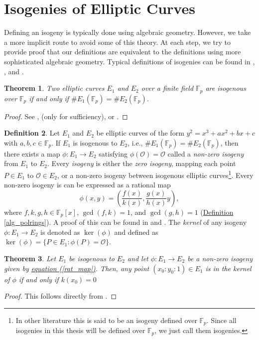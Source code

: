 \documentclass[openany, a4paper, 10pt]{book}
\theoremstyle{plain}
\newtheorem{theorem}{Theorem}[chapter]
\theoremstyle{plain}
\theoremstyle{plain}
\theoremstyle{definition}
\newtheorem{definition}[theorem]{Definition}
\theoremstyle{plain}
\theoremstyle{definition}
\theoremstyle{remark}
\renewcommand{\eqref}[1]{\hyperref[#1]{equation (\ref{#1})}}
\newcommand{\defref}[1]{\hyperref[#1]{Definition \ref{#1}}}
\begin{document}
\section{Isogenies of Elliptic Curves}\label{sec:isogenies}
Defining an isogeny is typically done using algebraic geometry.
However, we take a more implicit route to avoid some of this theory.
At each step, we try to provide proof that our definitions are equivalent to the definitions using more sophisticated algebraic geometry.
Typical definitions of isogenies can be found in
\cite[Chapter~5,Section~9.6]{galbraith_crypto},
\cite{rational_maps}, and
\cite[Chapters~I,II,Section~III.4]{arithmetic}.


\begin{theorem}\label{Sato-Tate}
    Two elliptic curves $E_1$ and $E_2$ over a finite field $\mathbb F_p$ are \emph{isogenous} over $\mathbb F_p$ if and only if $\#E_1(\mathbb F_p) = \#E_2(\mathbb F_p)$.
\end{theorem}
\begin{proof}
    See \cite{tate_isogeny_theorem}, \cite[Theorem~9.7.4]{galbraith_crypto} (only for sufficiency), or \cite[Exercise~5.4]{arithmetic}.
\end{proof}
\begin{definition}\label{is_isogeny}
    Let $E_1$ and $E_2$ be elliptic curves of the form $y^2 = x^3 + ax^2 + bx + c$ with $a,b,c \in \mathbb F_p$.
    If $E_1$ is isogenous to $E_2$, i.e., $\#E_1(\mathbb F_p) = \#E_2(\mathbb F_p)$, then there exists a map $\phi: E_1 \to E_2$ satisfying $\phi(\mathcal O) = \mathcal O$ called a \textit{non-zero isogeny} from $E_1$ to $E_2$.
    Every \textit{isogeny} is either the \textit{zero isogeny}, mapping each point $P \in E_1$ to $\mathcal O \in E_2$, or a non-zero isogeny between isogenous elliptic curves\footnote[2]{In other literature this is said to be an isogeny defined over $\mathbb F_p$. Since all isogenies in this thesis will be defined over $\mathbb F_p$, we just call them isogenies.}.
    Every non-zero isogeny is can be expressed as a rational map
    \begin{equation}\label{rat_map}
        \phi(x, y) = \left( \frac{f(x)}{k(x)}, \frac{g(x)}{h(x)}y \right),
    \end{equation}
    where $f,k,g,h \in \mathbb F_p[x]$, $\gcd(f, k) = 1$, and $\gcd(g, h) = 1$ (\defref{alg_polrings}).
    A proof of this can be found in \cite[Lemma~4.26]{rational_maps} and \cite[Lemma~9.6.12]{galbraith_crypto}.
    The \textit{kernel} of any isogeny $\phi: E_1 \to E_2$ is denoted as $\ker(\phi)$ and defined as $\ker(\phi) = \{ P \in E_1: \phi(P) = \mathcal O \}$.
\end{definition}
\begin{theorem}\label{ker_pol}
    Let $E_1$ be isogenous to $E_2$ and let $\phi: E_1 \to E_2$ be a non-zero isogeny given by \eqref{rat_map}.
    Then, any point $(x_0:y_0:1) \in E_1$ is in the kernel of $\phi$ if and only if $k(x_0) = 0$
\end{theorem}
\begin{proof}
    This follows directly from \cite[Corollary~4.28]{rational_maps}.
\end{proof}
\end{document}
